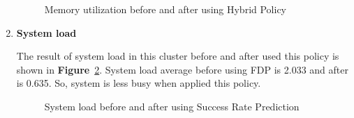 \documentclass[12pt,oneside,openright,a4paper]{cpe-english-project}
\begin{document}
\begin{enumerate}
\begin{figure}[!h]\centering
    \setlength{\fboxrule}{0mm} %
    \setlength{\fboxsep}{0cm}
    \caption{Memory utilization before and after using Hybrid Policy}\label{fig:mem3}
\end{figure}

\newpage
  \item \textbf{System load}
  
\hspace{10mm}The result of system load in this cluster before and after used this policy is shown in \textbf{Figure}~\ref{fig:load3}. System load average before using FDP is 2.033 and after is 0.635. So, system is less busy when applied this policy.
  
\begin{figure}[!h]\centering
    \setlength{\fboxrule}{0mm} %
    \setlength{\fboxsep}{0cm}
    \caption{System load before and after using Success Rate Prediction}\label{fig:load3}
\end{figure}
\end{enumerate}
\end{document}

